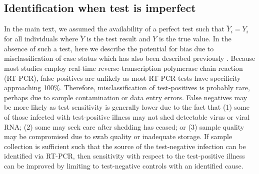 \begin{appendix}
\begin{refsection}


\newpage 

\section{Identification when test is imperfect}\label{sec:testing}
In the main text, we assumed the availability of a perfect test such that $\widetilde{Y}_i = Y_i$ for all individuals where $\widetilde{Y}$ is the test result and $Y$ is the true value. In the absence of such a test, here we describe the potential for bias due to misclassification of case status which has also been described previously \cite{sullivan_theoretical_2016}. Because most studies employ real-time reverse-transcription polymerase chain reaction (RT-PCR), false positives are unlikely as most RT-PCR tests have specificity approaching 100\%. Therefore, misclassification of test-positives is probably rare, perhaps due to sample contamination or data entry errors. False negatives may be more likely as test sensitivity is generally lower due to the fact that (1) some of those infected with test-positive illness may not shed detectable virus or viral RNA; (2) some may seek care after shedding has ceased; or (3) sample quality may be compromised due to swab quality or inadequate storage. If sample collection is sufficient such that the source of the test-negative infection can be identified via RT-PCR, then sensitivity with respect to the test-positive illness can be improved by limiting to test-negative controls with an identified cause. 


\end{refsection}
\end{appendix}
